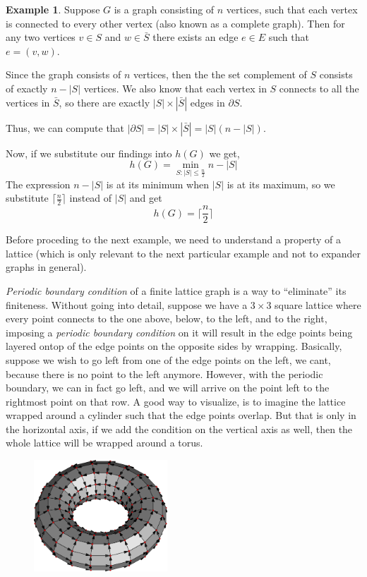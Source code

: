 \documentclass{article}
\theoremstyle{theorem}
\theoremstyle{definition}
\theoremstyle{example}
\newtheorem{example}{Example}[section]
\theoremstyle{proposition}
\begin{document}
        \begin{example}
            Suppose $G$ is a graph consisting of $n$ vertices, such that each vertex is connected to every other vertex (also known as a complete graph). Then for any two vertices $v \in S$ and $w \in \bar{S}$ there exists an edge $e \in E$ such that $e = (v,w)$.
            
            Since the graph consists of $n$ vertices, then the the set complement of $S$ consists of exactly $n-|S|$ vertices.
            We also know that each vertex in $S$ connects to all the vertices in $\bar{S}$, so there are exactly $|S| \times |\bar{S}|$ edges in $\partial{S}$.

            Thus, we can compute that $|\partial{S}| = |S| \times |\bar{S}| = |S|(n-|S|)$.

            Now, if we substitute our findings into $h(G)$ we get,
            \[h(G) = \min\limits_{S:|S| \leq \frac{n}{2}} n - |S|\]
            The expression $n - |S|$ is at its minimum when $|S|$ is at its maximum, so we substitute $\Big\lceil{\frac{n}{2}}\Big\rceil$ instead of $|S|$ and get
            \[h(G) = \Big\lceil{\frac{n}{2}}\Big\rceil\]
        \end{example}

        
        Before proceding to the next example, we need to understand a property of a lattice (which is only relevant to the next particular example and not to expander graphs in general).

        \textit{Periodic boundary condition} of a finite lattice graph is a way to ``eliminate'' its finiteness. Without going into detail, suppose we have a $3 \times 3$ square lattice where every point connects to the one above, below, to the left, and to the right, imposing a \textit{periodic boundary condition} on it will result in the edge points being layered ontop of the edge points on the opposite sides by wrapping. Basically, suppose we wish to go left from one of the edge points on the left, we cant, because there is no point to the left anymore. However, with the periodic boundary, we can in fact go left, and we will arrive on the point left to the rightmost point on that row. A good way to visualize, is to imagine the lattice wrapped around a cylinder such that the edge points overlap. But that is only in the horizontal axis, if we add the condition on the vertical axis as well, then the whole lattice will be wrapped around a torus.
            \begin{figure}[h]
                \includegraphics[width=5cm]{iu.png}
                \centering
            \end{figure}
\end{document}
